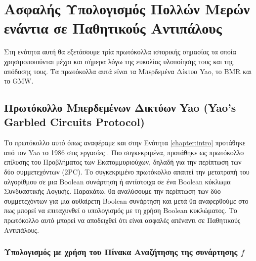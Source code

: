 \section{Ασφαλής Υπολογισμός Πολλών Μερών ενάντια σε Παθητικούς Αντιπάλους}

Στη ενότητα αυτή θα εξετάσουμε τρία πρωτόκολλα ιστορικής σημασίας τα οποία χρησιμοποιούνται μέχρι και σήμερα λόγω της ευκολίας υλοποίησης τους και της απόδοσης τους. Τα πρωτόκολλα αυτά είναι τα Μπερδεμένα Δίκτυα Yao, το BMR και το GMW.

\subsection{Πρωτόκολλο Μπερδεμένων Δικτύων Yao (Yao's Garbled Circuits Protocol)}
\label{section:yaos-gc}

Το πρωτόκολλο αυτό όπως αναφέραμε και στην Ενότητα \ref{chapter:intro} προτάθηκε από τον Yao το 1986 στις εργασίες \cite{4568207} \cite{4568388}. Πιο συγκεκριμένα, προτάθηκε ως πρωτόκολλο επίλυσης του Προβλήματος των Εκατομμυριούχων, δηλαδή για την περίπτωση των δύο συμμετεχόντων (2PC). Το συγκεκριμένο πρωτόκολλο απαιτεί την μετατροπή του αλγορίθμου σε μια Boolean συνάρτηση ή αντίστοιχα σε ένα Boolean κύκλωμα Συνδυαστικής Λογικής. Παρακάτω, θα αναλύσουμε την περίπτωση των δύο συμμετεχόντων για μια αυθαίρετη Boolean συνάρτηση και μετά θα αναφερθούμε στο πως μπορεί να επιταχυνθεί ο υπολογισμός με τη χρήση Boolean κυκλώματος. Το πρωτόκολλο αυτό μπορεί να αποδειχθεί ότι είναι ασφαλές απέναντι σε Παθητικούς Αντιπάλους.

\subsubsection{Υπολογισμός με χρήση του Πίνακα Αναζήτησης της συνάρτησης $f$}

